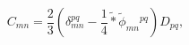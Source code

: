 \begin{equation}
    C_{mn} = \frac{2}{3}\left(
       \delta_{mn}^{pq}-\frac{1}{4}\tilde *\tilde\phi_{mn}{}^{pq}
       \right) D_{pq} ,
\end{equation}

